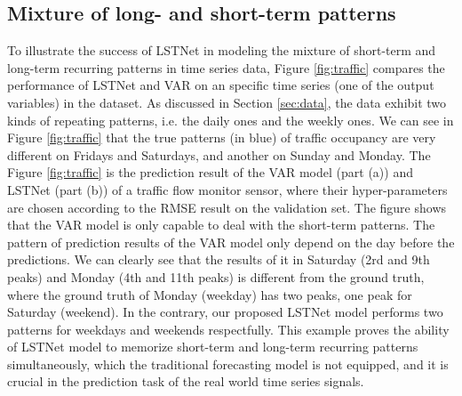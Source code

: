 \subsection{Mixture of long- and short-term patterns}
\label{sec:mixture}
To illustrate the success of LSTNet in modeling the mixture of short-term and long-term recurring patterns in time series data, Figure \ref{fig:traffic} compares the performance of LSTNet and VAR on an specific time series (one of the output variables) in the \traffic dataset.  As discussed in Section 
\ref{sec:data}, the \traffic data exhibit two kinds of repeating patterns, i.e. the daily ones and the weekly ones. We can see in Figure \ref{fig:traffic} that the true patterns (in blue) of traffic occupancy are very different on Fridays and Saturdays, and another on Sunday and Monday.
The Figure \ref{fig:traffic} is the prediction result of the VAR model (part (a)) and LSTNet (part (b)) of a traffic flow monitor sensor, where their hyper-parameters are chosen according to the RMSE result on the validation set. The figure shows that the VAR model is only capable to deal with the short-term patterns. The pattern of prediction results of the VAR model only depend on the day before the predictions. We can clearly see that the results of it in Saturday (2rd and 9th peaks) and Monday (4th and 11th peaks) is different from the ground truth, where the ground truth of Monday (weekday) has two peaks, one peak for Saturday (weekend). In the contrary, our proposed LSTNet model performs two patterns for weekdays and weekends respectfully. This example proves the ability of LSTNet model to memorize short-term and long-term recurring patterns simultaneously, which the traditional forecasting model is not equipped, and it is crucial in the prediction task of the real world time series signals. 


